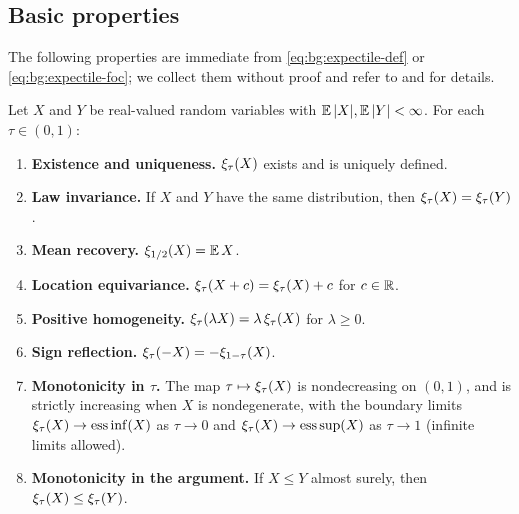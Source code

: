 \subsection{Basic properties}

The following properties are immediate from
\eqref{eq:bg:expectile-def} or \eqref{eq:bg:expectile-foc}; we collect
them without proof and refer to \textcite[\S2]{NeweyPowell1987} and
\textcite[Sections~2--3]{BelliniKlarMullerRosazzaGianin2014} for
details.

\begin{proposition}
\label{prop:bg:expectile-properties}
Let $X$ and $Y$ be real-valued random variables with $\operatorname{\mathbb{E}} |X|, \operatorname{\mathbb{E}} |Y|
< \infty$. For each $\tau \in (0, 1)$:
\begin{enumerate}[label=(\roman*)]
\item \textbf{Existence and uniqueness.} $\xi_{\tau}(X)$ exists
      and is uniquely defined.
\item \textbf{Law invariance.} If $X$ and $Y$ have the same
      distribution, then $\xi_{\tau}(X)=\xi_{\tau}(Y)$.
\item \textbf{Mean recovery.} $\xi_{1/2}(X) = \operatorname{\mathbb{E}} X$.
\item \textbf{Location equivariance.}
      $\xi_{\tau}(X + c) = \xi_{\tau}(X) + c$ for
      $c \in \mathbb{R}$.
\item \textbf{Positive homogeneity.}
      $\xi_{\tau}(\lambda X) = \lambda\, \xi_{\tau}(X)$
      for $\lambda \ge 0$.
\item \textbf{Sign reflection.}
      $\xi_{\tau}(-X) = -\xi_{1 - \tau}(X)$.
\item \textbf{Monotonicity in $\tau$.} The map
      $\tau \mapsto \xi_{\tau}(X)$ is nondecreasing on
      $(0, 1)$, and is strictly increasing when $X$ is nondegenerate,
      with the boundary limits
      $\xi_{\tau}(X) \to \mathrm{ess}\inf(X)$ as $\tau \to 0$
      and $\xi_{\tau}(X) \to \mathrm{ess}\sup(X)$ as
      $\tau \to 1$ (infinite limits allowed).
\item \textbf{Monotonicity in the argument.} If $X \le Y$ almost
      surely, then $\xi_{\tau}(X) \le \xi_{\tau}(Y)$.
\end{enumerate}
\end{proposition}

